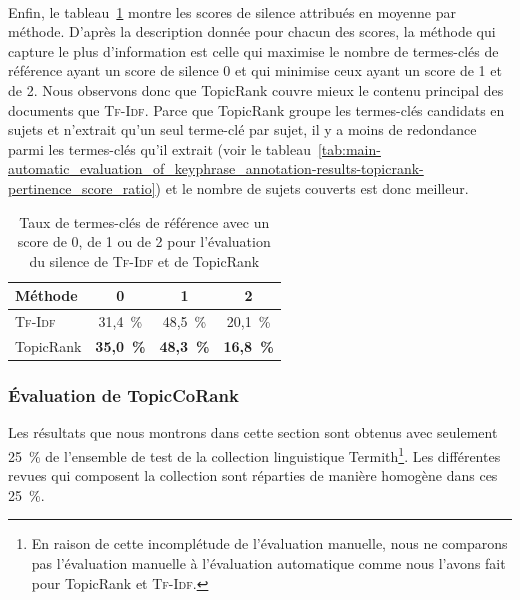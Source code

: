         ~\\Enfin, le
        tableau~\ref{tab:main-automatic_evaluation_of_keyphrase_annotation-results-topicrank-silence_score_ratio}
        montre les scores de silence attribués en moyenne par méthode. D'après
        la description donnée pour chacun des scores, la méthode qui capture le
        plus d'information est celle qui maximise le nombre de termes-clés de
        référence ayant un score de silence 0 et qui minimise ceux ayant un
        score de 1 et de 2. Nous observons donc que TopicRank couvre mieux le
        contenu principal des documents que \textsc{Tf-Idf}. Parce que TopicRank
        groupe les termes-clés candidats en sujets et n'extrait qu'un seul
        terme-clé par sujet, il y a moins de redondance parmi les termes-clés
        qu'il extrait (voir le
        tableau~\ref{tab:main-automatic_evaluation_of_keyphrase_annotation-results-topicrank-pertinence_score_ratio})
        et le nombre de sujets couverts est donc meilleur.
        \begin{table}[h!]
          \centering
          \begin{tabular}{l|c|c|c}
            \toprule
            \textbf{Méthode} & \textbf{0} & \textbf{1} & \textbf{2}\\
            \hline
            \textsc{Tf-Idf} & 31,4~\% & 48,5~\% & 20,1~\%\\
            TopicRank & \textbf{35,0~\%} & \textbf{48,3~\%} & \textbf{16,8~\%}\\
            \bottomrule
          \end{tabular}
          \caption{Taux de termes-clés de référence avec un score de 0, de 1 ou
                   de 2 pour l'évaluation du silence de \textsc{Tf-Idf} et de
                   TopicRank
                   \label{tab:main-automatic_evaluation_of_keyphrase_annotation-results-topicrank-silence_score_ratio}}
        \end{table}

      \subsubsection{Évaluation de TopicCoRank}
      \label{subsubsec:main-domain_specific_keyphrase_annotation-manual_evaluation-analysis-topiccorank}
        Les résultats que nous montrons dans cette section sont obtenus avec
        seulement 25~\% de l'ensemble de test de la collection linguistique
        Termith\footnote{En raison de cette incomplétude de l'évaluation
        manuelle, nous ne comparons pas l'évaluation manuelle à l'évaluation
        automatique comme nous l'avons fait pour TopicRank et \textsc{Tf-Idf}.}.
        Les différentes revues qui composent la collection sont
        réparties de manière homogène dans ces 25~\%.


